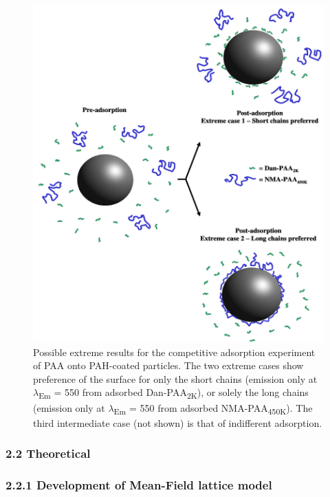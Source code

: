 \documentclass[journal=mamobx,manuscript=article]{achemso}
\begin{document}
\begin{figure}[H]
\includegraphics[scale=0.75]{Presentation1.pdf}
\caption{Possible extreme results for the competitive adsorption experiment of PAA onto PAH-coated particles.  The two extreme cases show preference of the surface for only the short chains (emission only at $\lambda$\textsubscript{Em} = 550 from adsorbed Dan-PAA\textsubscript{2K}), or solely the long chains (emission only at $\lambda$\textsubscript{Em} = 550 from adsorbed NMA-PAA\textsubscript{450K}).  The third intermediate case (not shown) is that of indifferent adsorption.}
\label{figure 4}
\end{figure}


\subsubsection{2.2  Theoretical}   %
    \label{sec-meth-theor}

\subsubsection{2.2.1 Development of Mean-Field lattice model}   %
   \label{sec-devMF}
\end{document}
